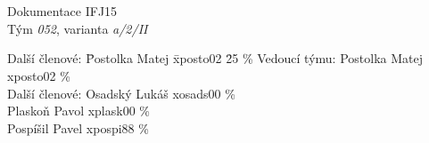 \documentclass[a4paper, 12pt]{article}
\begin{document}
\begin{titlepage}

\begin{center}
\fontsize{25}{20}\\
\fontsize{21}{0}\textsc{\selectfont{Fakulta informačních technologií}}\\
\begin{figure}[ht]
    \begin{center}
    \end{center}
\end{figure}

\LARGE{Dokumentace IFJ15}\\
\Large{Tým \textit{052}, varianta \textit{a/2/II}}
\end{center}

\begin{large}
\begin{tabbing}
    Další členové: \quad \= Postolka Matej \quad \= xposto02 \quad \= 25 \%\kill
    Vedoucí týmu:  \> Postolka Matej \> xposto02  \% \\
    Další členové: \> Osadský Lukáš  \> xosads00  \% \\
             \> Plaskoň Pavol  \> xplask00  \% \\
             \> Pospíšil Pavel \> xpospi88  \% \\
\end{tabbing}
\end{large}

\end{titlepage}
\end{document}
